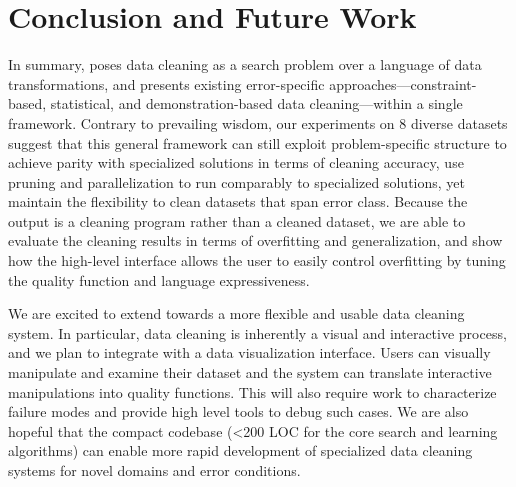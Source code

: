 \section{Conclusion and Future Work}
In summary, \sys poses data cleaning as a search problem over a language of data transformations, and presents existing error-specific approaches---constraint-based, statistical, and demonstration-based data cleaning---within a single framework.
Contrary to prevailing wisdom, our experiments on 8 diverse datasets suggest that this general framework can still exploit problem-specific structure to achieve parity with specialized solutions in terms of cleaning accuracy, use pruning and parallelization to run comparably to specialized solutions, yet maintain the flexibility to clean datasets that span error class.       
Because the output is a cleaning program rather than a cleaned dataset, we are able to evaluate the cleaning results in terms of overfitting and generalization, and show how the high-level interface allows the user to easily control overfitting by tuning the quality function and language expressiveness.  

We are excited to extend \sys towards a more flexible and usable data cleaning system.  In particular, data cleaning is inherently a visual and interactive process, and we plan to integrate \sys with a data visualization interface.   Users can visually manipulate and examine their dataset and the system can translate interactive manipulations into quality functions.  This will also require work to characterize failure modes and provide high level tools to debug such cases.  We are also hopeful that the compact codebase (<200 LOC for the core search and learning algorithms) can enable more rapid development of specialized data cleaning systems for novel domains and error conditions.  


% 
% 
